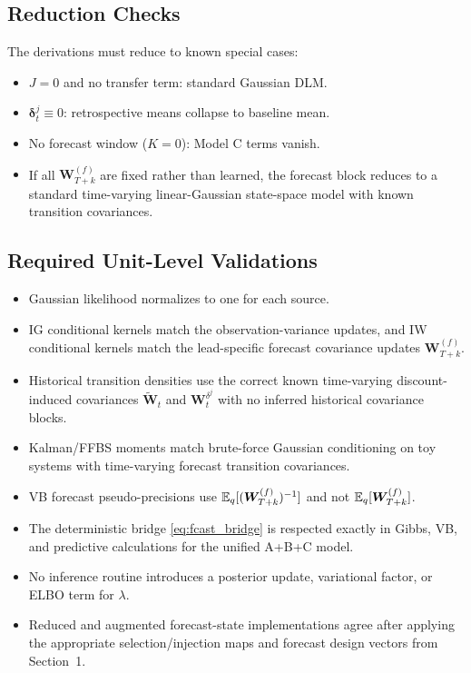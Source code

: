 \subsection{Reduction Checks}
The derivations must reduce to known special cases:
\begin{itemize}
\item $J=0$ and no transfer term: standard Gaussian DLM.
\item $\bm\delta_t^j\equiv 0$: retrospective means collapse to baseline mean.
\item No forecast window ($K=0$): Model C terms vanish.
\item If all $\bm W_{T+k}^{(f)}$ are fixed rather than learned, the forecast block reduces
      to a standard time-varying linear-Gaussian state-space model with known transition covariances.
\end{itemize}

\subsection{Required Unit-Level Validations}
\begin{itemize}
\item Gaussian likelihood normalizes to one for each source.
\item IG conditional kernels match the observation-variance updates, and IW conditional kernels
      match the lead-specific forecast covariance updates $\bm W_{T+k}^{(f)}$.
\item Historical transition densities use the correct known time-varying discount-induced
      covariances $\tilde{\bm W}_t$ and $\bm W_t^{\delta^j}$ with no inferred historical
      covariance blocks.
\item Kalman/FFBS moments match brute-force Gaussian conditioning on toy systems with
      time-varying forecast transition covariances.
\item VB forecast pseudo-precisions use $\mathbb{E}_q[(\bm W_{T+k}^{(f)})^{-1}]$ and not
      $\mathbb{E}_q[\bm W_{T+k}^{(f)}]$.
\item The deterministic bridge \eqref{eq:fcast_bridge} is respected exactly in Gibbs, VB, and
      predictive calculations for the unified A+B+C model.
\item No inference routine introduces a posterior update, variational factor, or ELBO term for
      $\lambda$.
\item Reduced and augmented forecast-state implementations agree after applying the appropriate
      selection/injection maps and forecast design vectors from Section~1.
\end{itemize}

